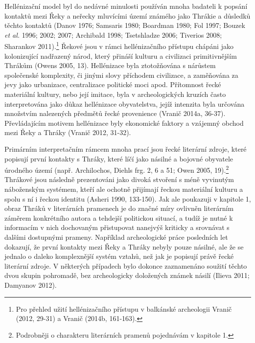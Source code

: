 Hellénizační model byl do nedávné minulosti používán mnoha badateli k popsání kontaktů mezi Řeky a neřecky mluvícími území známého jako Thrákie a důsledků těchto kontaktů (Danov 1976; Samsaris 1980; Boardman 1980; Fol 1997; Bouzek {\em et al.} 1996; 2002; 2007; Archibald 1998; Tsetshladze 2006; Tiverios 2008; Sharankov 2011).\footnote{Pro přehled užití hellénizačního přístupu v balkánské archeologii Vranič (2012, 29-31) a Vranič (2014b, 161-163).} Řekové jsou v rámci hellénizačního přístupu chápáni jako kolonizující nadřazený národ, který přináší kulturu a civilizaci primitivnějším Thrákům (Owens 2005, 13). Hellénizace byla ztotožňována s nárůstem společenské komplexity, či jinými slovy příchodem civilizace, a zaměňována za jevy jako urbanizace, centralizace politické moci apod. Přítomnost řecké materiální kultury, nebo její imitace, byla v archeologických kruzích často interpretována jako důkaz hellénizace obyvatelstva, jejíž intenzita byla určována množstvím nalezených předmětů řecké provenience (Vranič 2014a, 36-37). Převládajícím motivem hellénizace byly ekonomické faktory a vzájemný obchod mezi Řeky a Thráky (Vranič 2012, 31-32).

Primárním interpretačním rámcem mnoha prací jsou řecké literární zdroje, které popisují první kontakty s Thráky, které líčí jako násilné a bojovné obyvatele úrodného území (např. Archilochos, Diehls frg. 2, 6 a 51; Owen 2005, 19).\footnote{Podrobněji o charakteru literárních pramenů pojednávám v kapitole 1.} Thrákové jsou následně prezentováni jako divoká stvoření s méně vyvinutým náboženským systémem, kteří ale ochotně přijímají řeckou materiální kulturu a spolu s ní i řeckou identitu (Asheri 1990, 133-150). Jak ale poukazuji v kapitole 1, obraz Thráků v literárních pramenech je do značné míry ovlivněn literárním záměrem konkrétního autora a tehdejší politickou situací, a tudíž je nutné k informacím v nich dochovaným přistupovat nanejvýš kriticky a srovnávat s dalšími dostupnými prameny. Například archeologické práce posledních let dokazují, že první kontakty mezi Řeky a Thráky nebyly pouze násilné, ale že se jednalo o daleko komplexnější systém vztahů, než jak je popisují právě řecké literární zdroje. V některých případech bylo dokonce zaznamenáno soužití těchto dvou skupin pohromadě, bez archeologicky doložených známek násilí (Ilieva 2011; Damyanov 2012).

